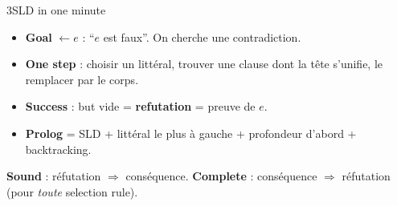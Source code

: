\documentclass[10pt]{article}
\begin{document}
\begin{minipage}[t]{0.32\textwidth}
\begin{bloc}{\num{3}SLD in one minute}
\begin{itemize}
  \item \textbf{Goal} $\leftarrow e$ : ``$e$ est faux''. On cherche une contradiction.
  \item \textbf{One step} : choisir un littéral, trouver une clause dont la tête s'unifie, le remplacer par le corps.
  \item \textbf{Success} : but vide = \textbf{refutation} = preuve de $e$.
  \item \textbf{Prolog} = SLD + littéral le plus à gauche + profondeur d'abord + backtracking.
\end{itemize}
\textbf{Sound} : réfutation $\Rightarrow$ conséquence. \textbf{Complete} : conséquence $\Rightarrow$ réfutation (pour \emph{toute} selection rule).
\end{bloc}
\end{minipage}

\vspace{4pt}
\end{document}
